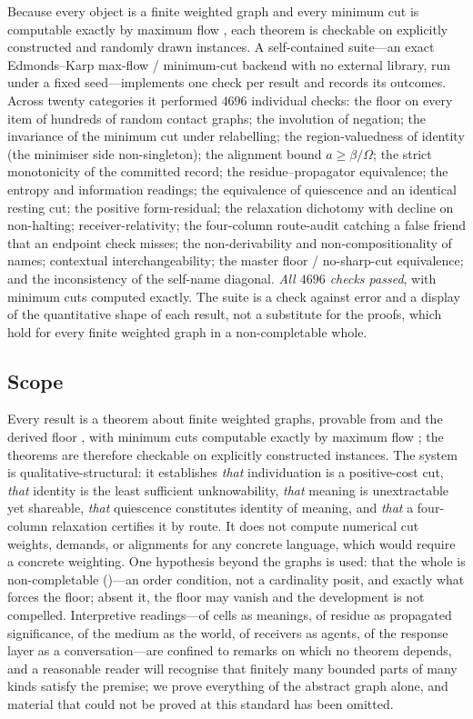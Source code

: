 \documentclass[twocolumn,11pt,a4paper]{article}
\theoremstyle{sup}
\theoremstyle{definition}
\theoremstyle{remark}
\newcommand{\flo}{\beta}
\newcommand{\al}{a}
\newcommand{\Om}{\Omega}
\begin{document}
Because every object is a finite weighted graph and every minimum cut is
computable exactly by maximum flow \citep{fordfulkerson1956,menger1927}, each
theorem is checkable on explicitly constructed and randomly drawn instances. A
self-contained suite---an exact Edmonds--Karp max-flow / minimum-cut backend with
no external library, run under a fixed seed---implements one check per result and
records its outcomes. Across twenty categories it performed $4696$ individual
checks: the floor on every item of hundreds of random contact graphs; the
involution of negation; the invariance of the minimum cut under relabelling; the
region-valuedness of identity (the minimiser side non-singleton); the alignment
bound $\al\ge\flo/\Om$; the strict monotonicity of the committed record; the
residue--propagator equivalence; the entropy and information readings; the
equivalence of quiescence and an identical resting cut; the positive
form-residual; the relaxation dichotomy with decline on non-halting;
receiver-relativity; the four-column route-audit catching a false friend that an
endpoint check misses; the non-derivability and non-compositionality of names;
contextual interchangeability; the master floor / no-sharp-cut equivalence; and
the inconsistency of the self-name diagonal. \emph{All $4696$ checks passed}, with
minimum cuts computed exactly. The suite is a check against error and a display of
the quantitative shape of each result, not a substitute for the proofs, which hold
for every finite weighted graph in a non-completable whole.

\subsection{Scope}

Every result is a theorem about finite weighted graphs, provable from
 and the derived floor , with minimum cuts
computable exactly by maximum flow \citep{fordfulkerson1956,menger1927}; the
theorems are therefore checkable on explicitly constructed instances. The system
is qualitative-structural: it establishes \emph{that} individuation is a
positive-cost cut, \emph{that} identity is the least sufficient unknowability,
\emph{that} meaning is unextractable yet shareable, \emph{that} quiescence
constitutes identity of meaning, and \emph{that} a four-column relaxation
certifies it by route. It does not compute numerical cut weights, demands, or
alignments for any concrete language, which would require a concrete weighting.
One hypothesis beyond the graphs is used: that the whole is non-completable
()---an order condition, not a cardinality posit, and
exactly what forces the floor; absent it, the floor may vanish and the
development is not compelled. Interpretive readings---of cells as meanings, of
residue as propagated significance, of the medium as the world, of receivers as
agents, of the response layer as a conversation---are confined to remarks on
which no theorem depends, and a reasonable reader will recognise that finitely
many bounded parts of many kinds satisfy the premise; we prove everything of the
abstract graph alone, and material that could not be proved at this standard has
been omitted.
\end{document}
